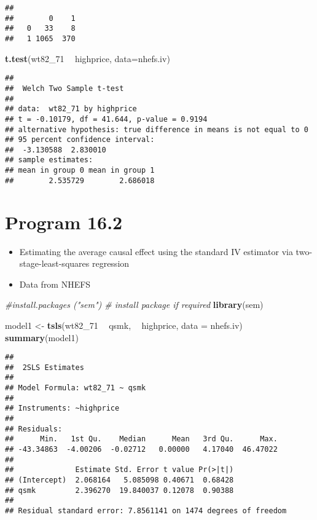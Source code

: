 \documentclass[10pt,]{book}
\newenvironment{Shaded}{\begin{snugshade}}{\end{snugshade}}
\newcommand{\CommentTok}[1]{\textcolor[rgb]{0.56,0.35,0.01}{\textit{#1}}}
\newcommand{\DataTypeTok}[1]{\textcolor[rgb]{0.13,0.29,0.53}{#1}}
\newcommand{\DecValTok}[1]{\textcolor[rgb]{0.00,0.00,0.81}{#1}}
\newcommand{\KeywordTok}[1]{\textcolor[rgb]{0.13,0.29,0.53}{\textbf{#1}}}
\newcommand{\NormalTok}[1]{#1}
\newcommand{\OperatorTok}[1]{\textcolor[rgb]{0.81,0.36,0.00}{\textbf{#1}}}
\newcommand{\StringTok}[1]{\textcolor[rgb]{0.31,0.60,0.02}{#1}}
\providecommand{\tightlist}{%
  \setlength{\itemsep}{0pt}\setlength{\parskip}{0pt}}
\begin{document}
\begin{verbatim}
##    
##        0    1
##   0   33    8
##   1 1065  370
\end{verbatim}

\begin{Shaded}
\begin{Highlighting}[]
\KeywordTok{t.test}\NormalTok{(wt82_}\DecValTok{71} \OperatorTok{~}\StringTok{ }\NormalTok{highprice, }\DataTypeTok{data=}\NormalTok{nhefs.iv)}
\end{Highlighting}
\end{Shaded}

\begin{verbatim}
## 
##  Welch Two Sample t-test
## 
## data:  wt82_71 by highprice
## t = -0.10179, df = 41.644, p-value = 0.9194
## alternative hypothesis: true difference in means is not equal to 0
## 95 percent confidence interval:
##  -3.130588  2.830010
## sample estimates:
## mean in group 0 mean in group 1 
##        2.535729        2.686018
\end{verbatim}

\hypertarget{program-16.2}{%
\section{Program 16.2}\label{program-16.2}}

\begin{itemize}
\tightlist
\item
  Estimating the average causal effect using the standard IV estimator via two-stage-least-squares regression
\item
  Data from NHEFS
\end{itemize}

\begin{Shaded}
\begin{Highlighting}[]
\CommentTok{#install.packages ("sem") # install package if required}
\KeywordTok{library}\NormalTok{(sem) }

\NormalTok{model1 <-}\StringTok{ }\KeywordTok{tsls}\NormalTok{(wt82_}\DecValTok{71} \OperatorTok{~}\StringTok{ }\NormalTok{qsmk, }\OperatorTok{~}\StringTok{ }\NormalTok{highprice, }\DataTypeTok{data =}\NormalTok{ nhefs.iv)}
\KeywordTok{summary}\NormalTok{(model1)}
\end{Highlighting}
\end{Shaded}

\begin{verbatim}
## 
##  2SLS Estimates
## 
## Model Formula: wt82_71 ~ qsmk
## 
## Instruments: ~highprice
## 
## Residuals:
##      Min.   1st Qu.    Median      Mean   3rd Qu.      Max. 
## -43.34863  -4.00206  -0.02712   0.00000   4.17040  46.47022 
## 
##              Estimate Std. Error t value Pr(>|t|)
## (Intercept)  2.068164   5.085098 0.40671  0.68428
## qsmk         2.396270  19.840037 0.12078  0.90388
## 
## Residual standard error: 7.8561141 on 1474 degrees of freedom
\end{verbatim}
\end{document}
